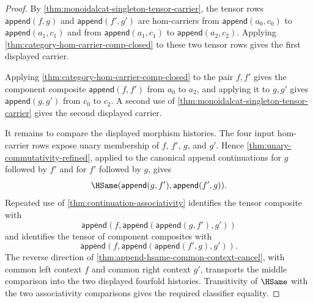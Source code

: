 \begin{proof}
By \autoref{thm:monoidalcat-singleton-tensor-carrier}, the tensor rows $\mathsf{append}(f,g)$ and $\mathsf{append}(f',g')$ are hom-carriers from $\mathsf{append}(a_0,c_0)$ to $\mathsf{append}(a_1,c_1)$ and from $\mathsf{append}(a_1,c_1)$ to $\mathsf{append}(a_2,c_2)$. Applying \autoref{thm:category-hom-carrier-comp-closed} to these two tensor rows gives the first displayed carrier.

Applying \autoref{thm:category-hom-carrier-comp-closed} to the pair $f,f'$ gives the component composite $\mathsf{append}(f,f')$ from $a_0$ to $a_2$, and applying it to $g,g'$ gives $\mathsf{append}(g,g')$ from $c_0$ to $c_2$. A second use of \autoref{thm:monoidalcat-singleton-tensor-carrier} gives the second displayed carrier.

It remains to compare the displayed morphism histories. The four input hom-carrier rows expose unary membership of $f$, $f'$, $g$, and $g'$. Hence \autoref{thm:unary-commutativity-refined}, applied to the canonical append continuations for $g$ followed by $f'$ and for $f'$ followed by $g$, gives
$$
\HSame(\mathsf{append}(g,f'),\mathsf{append}(f',g)).
$$
Repeated use of \autoref{thm:continuation-associativity} identifies the tensor composite with
$$
\mathsf{append}(f,\mathsf{append}(\mathsf{append}(g,f'),g'))
$$
and identifies the tensor of component composites with
$$
\mathsf{append}(f,\mathsf{append}(\mathsf{append}(f',g),g')).
$$
The reverse direction of \autoref{thm:append-hsame-common-context-cancel}, with common left context $f$ and common right context $g'$, transports the middle comparison into the two displayed fourfold histories. Transitivity of $\HSame$ with the two associativity comparisons gives the required classifier equality.
\end{proof}

